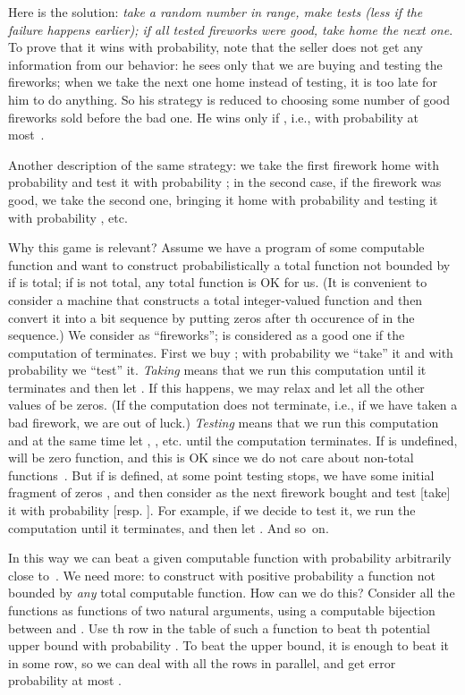 \documentclass[12pt]{article}
\begin{document}
Here is the solution: \emph{take a random number  in  range, make  tests \textup(less if the failure happens earlier\textup{);} if all  tested fireworks were good, take home the next one}. To prove that it wins with  probability, note that the seller does not get any information from our behavior: he sees only that we are buying and testing the fireworks; when we take the next one home instead of testing, it is too late for him to do anything. So his strategy is reduced to choosing some number  of good fireworks sold before the bad one. He wins only if , i.e., with probability at most~.

Another description of the same strategy: we take the first firework home with probability  and test it with probability ; in the second case, if the firework was good, we take the second one,  bringing it home with probability  and testing it with probability , etc.

Why this game is relevant? Assume we have a program of some computable function  and want to construct probabilistically a total function  not bounded by  if  is total; if  is not total, any total function  is OK for us. (It is convenient to consider a machine that constructs a total integer-valued function  and then convert it into a bit sequence by putting  zeros after th occurence of  in the sequence.) We consider  as ``fireworks'';  is considered as a good one if the computation of  terminates. First we buy ; with probability  we ``take'' it and with probability  we ``test'' it. \emph{Taking}  means that we run this computation until it terminates and then let . If this happens, we may relax and let all the other values of  be zeros. (If the computation does not terminate, i.e., if we have taken a bad firework, we are out of luck.) \emph{Testing}  means that we run this computation and at the same time let , , etc. until the computation terminates. If  is undefined,  will be zero function, and this is OK since we do not care about non-total functions~. But if  is defined, at some point testing stops, we have some initial fragment of zeros , and then consider  as the next firework bought and test [take] it with probability  [resp. ]. For example, if we decide to test it, we run the computation  until it terminates, and then let . And so~on.

In this way we can beat a given computable function  with probability arbitrarily close to~. We need more: to construct with positive probability a function not bounded by \emph{any} total computable function. How can we do this? Consider all the functions as functions of two natural arguments, using a computable bijection between  and .  Use th row  in the table of such a function to beat th potential upper bound with probability . To beat the upper bound, it is enough to beat it in some row, so we can deal with all the rows in parallel, and get error probability at most .
\end{document}
